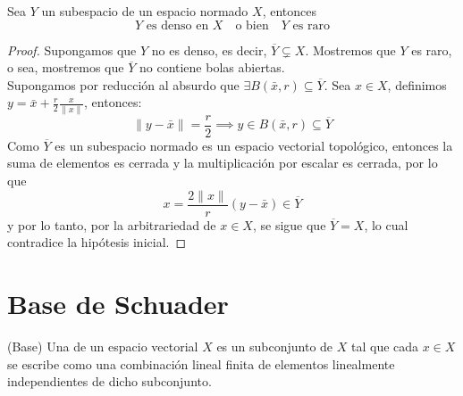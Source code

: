 \begin{prop}\label{prop:denso-raro}
    Sea $Y$ un subespacio de un espacio normado $X$, entonces
    \begin{equation*}
            Y \text{ es denso en } X \quad \text{o bien} \quad Y \text{ es raro}    
    \end{equation*}

\begin{proof}
    Supongamos que $Y$ no es denso, es decir, $\overline{Y} \subsetneq X$. Mostremos que $Y$ es raro, o sea, mostremos que $\overline{Y}$ no contiene bolas abiertas.  \\
    \noindent
    Supongamos por reducción al absurdo que $\exists B(\bar{x}, r) \subseteq \overline{Y}$. Sea $x \in X$, definimos $y = \bar{x} + \frac{r}{2} \frac{x}{\|x\|}$, entonces:
    \begin{equation*}
        \|y - \bar{x}\| = \frac{r}{2} \implies y \in B(\bar{x}, r) \subseteq \overline{Y}
    \end{equation*}
    Como $\overline{Y}$ es un subespacio normado es un espacio vectorial topológico, entonces la suma de elementos es cerrada y la multiplicación por escalar es cerrada, por lo que
    \begin{equation*}
        x = \frac{2\|x\|}{r} (y - \bar{x}) \in \overline{Y}
    \end{equation*}
    y por lo tanto, por la arbitrariedad de $x \in X$, se sigue que $\overline{Y} = X$, lo cual contradice la hipótesis inicial.
\end{proof}
\end{prop}

\section{Base de Schuader}

\begin{definicion}(Base)
    Una  de un espacio vectorial $X$ es un subconjunto de $X$ tal que cada $x \in X$ se escribe como una combinación lineal finita de elementos linealmente independientes de dicho subconjunto.
\end{definicion}

